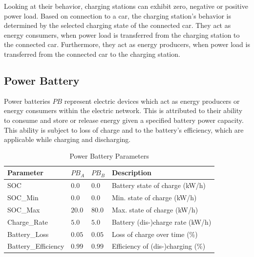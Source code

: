 



Looking at their behavior, charging stations can exhibit zero, negative or positive power load. Based on connection to a car, the charging station's behavior is determined by the selected charging state of the connected car. They act as energy consumers, when power load is transferred from the charging station to the connected car. Furthermore, they act as energy producers, when power load is transferred from the connected car to the charging station.

\subsection{Power Battery}
Power batteries $PB$ represent electric devices which act as energy producers or energy consumers within the electric network.
This is attributed to their ability to consume and store or release energy given a specified battery power capacity. This ability is subject to loss of charge and to the battery's efficiency, which are applicable while charging and discharging. 

\begin{table}[h]
	\renewcommand{\arraystretch}{1.3}
	\caption{Power Battery Parameters}
	\centering
	\begin{tabular}{llll}
		\hline
		\textbf{Parameter}     & \textbf{$PB_{A}$} & \textbf{$PB_{B}$} & \textbf{Description} \\ \hline
		SOC                     & $0.0$ & $0.0$ & Battery state of charge (kW/h)                   \\
		SOC\_Min                & $0.0$ & $0.0$ & Min. state of charge (kW/h)                   \\
		SOC\_Max               & $20.0$ & $80.0$ &  Max. state of charge (kW/h)                    \\
		Charge\_Rate            & $5.0$ & $5.0$ & Battery (dis-)charge rate (kW/h)     \\ 
		Battery\_Loss           & $0.05$ & $0.05$ & Loss of charge over time (\%)\\
		Battery\_Efficiency      & $0.99$ & $0.99$ &Efficiency of (dis-)charging (\%)     \\ \hline
	\end{tabular}
\end{table}

